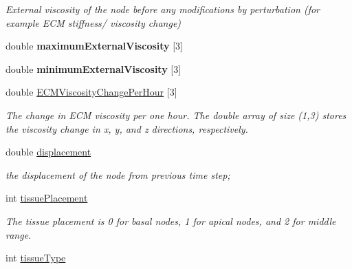 \begin{DoxyCompactItemize}
\begin{DoxyCompactList}\small\item\em External viscosity of the node before any modifications by perturbation (for example E\+C\+M stiffness/ viscosity change) \end{DoxyCompactList}\item 
\hypertarget{classNode_a6ea381457b01d655a8d67bfd9755e5b6}{}double {\bfseries maximum\+External\+Viscosity} \mbox{[}3\mbox{]}\label{classNode_a6ea381457b01d655a8d67bfd9755e5b6}

\item 
\hypertarget{classNode_a226bd3eaa57c1317716193a02bd04187}{}double {\bfseries minimum\+External\+Viscosity} \mbox{[}3\mbox{]}\label{classNode_a226bd3eaa57c1317716193a02bd04187}

\item 
\hypertarget{classNode_a1fbd9839d04036b5a5570e197e8e591c}{}double \hyperlink{classNode_a1fbd9839d04036b5a5570e197e8e591c}{E\+C\+M\+Viscosity\+Change\+Per\+Hour} \mbox{[}3\mbox{]}\label{classNode_a1fbd9839d04036b5a5570e197e8e591c}

\begin{DoxyCompactList}\small\item\em The change in E\+C\+M viscosity per one hour. The double array of size (1,3) stores the viscosity change in x, y, and z directions, respectively. \end{DoxyCompactList}\item 
\hypertarget{classNode_a1f25afa638813548bef54299c2d756e4}{}double \hyperlink{classNode_a1f25afa638813548bef54299c2d756e4}{displacement}\label{classNode_a1f25afa638813548bef54299c2d756e4}

\begin{DoxyCompactList}\small\item\em the displacement of the node from previous time step; \end{DoxyCompactList}\item 
\hypertarget{classNode_af754322e3928dc45f70b19762551890a}{}int \hyperlink{classNode_af754322e3928dc45f70b19762551890a}{tissue\+Placement}\label{classNode_af754322e3928dc45f70b19762551890a}

\begin{DoxyCompactList}\small\item\em The tissue placement is 0 for basal nodes, 1 for apical nodes, and 2 for middle range. \end{DoxyCompactList}\item 
\hypertarget{classNode_ae621097f98f1d33d283cf65a0a02d29a}{}int \hyperlink{classNode_ae621097f98f1d33d283cf65a0a02d29a}{tissue\+Type}\label{classNode_ae621097f98f1d33d283cf65a0a02d29a}


\end{DoxyCompactItemize}
